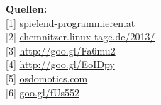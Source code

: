 \textbf{Quellen:} \\
{[}1{]} \href{http://spielend-programmieren.at}{spielend-programmieren.at} \\
{[}2{]} \href{http://chemnitzer.linux-tage.de/2013/}{chemnitzer.linux-tage.de/2013/} \\
{[}3{]} \href{http://wiki.skolelinux.de/KurtGramlich/Biografie}{http://goo.gl/Fa6mu2} \\
{[}4{]} \href{http://datenkanal.org/archives/14-Interview-mit-Kurt-Gramlich-zu-Skolelinux.html}{http://goo.gl/EoIDpy} \\
{[}5{]} \href{http://osdomotics.com}{osdomotics.com} \\
{[}6{]} \href{http://spielend-programmieren.at/de:sonstiges:alter_blog:2009:0318_chemnitzer_linux-tage_2009}{goo.gl/fUs552} 




